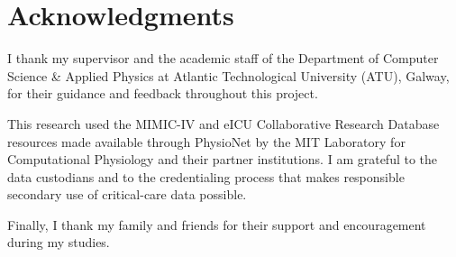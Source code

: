 \chapter*{Acknowledgments}

I thank my supervisor and the academic staff of the Department of Computer
Science \& Applied Physics at Atlantic Technological University (ATU), Galway,
for their guidance and feedback throughout this project.

This research used the MIMIC-IV and eICU Collaborative Research Database
resources made available through PhysioNet by the MIT Laboratory for
Computational Physiology and their partner institutions. I am grateful to the
data custodians and to the credentialing process that makes responsible
secondary use of critical-care data possible.

Finally, I thank my family and friends for their support and encouragement
during my studies.
